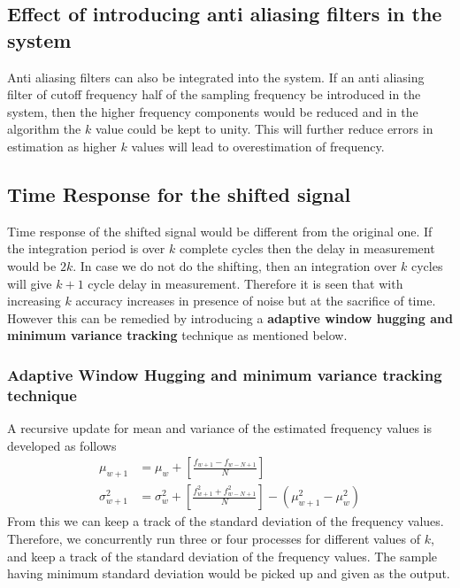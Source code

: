 \subsection{Effect of introducing anti aliasing filters in the system}
Anti aliasing filters can also be integrated into the system. If an anti aliasing filter of cutoff frequency half of the sampling frequency be introduced in the system, then the higher frequency components would be reduced and in the algorithm  the $k$ value could be kept to unity. This will further reduce errors in estimation as higher $k$ values will lead to overestimation of frequency.

\subsection{Time Response for the shifted signal}
Time response of the shifted signal would be different from the original one. If the integration period is over $k$ complete cycles then the delay in measurement would be $2k$. In case we do not do the shifting, then an integration over $k$ cycles will give $k+1$ cycle delay in measurement. Therefore it is seen that with increasing $k$ accuracy increases in presence of noise but at the sacrifice of time. However this can be remedied by introducing a {\bf adaptive window hugging and minimum variance tracking} technique as mentioned below.
\subsubsection{Adaptive Window Hugging and minimum variance tracking technique}
A recursive update for mean and variance of the estimated frequency values is developed as follows
\begin{align*}
\mu_{w+1} &= \mu_w + \left[\frac{f_{w+1}-f_{w-N+1}}{N}\right]\\
\sigma^2_{w+1} &= \sigma^2_{w} + \left[\frac{f^2_{w+1} + f^2_{w-N+1}}{N}\right] - (\mu^2_{w+1} - \mu^2_{w})
\end{align*}
From this we can keep a track of the standard deviation of the frequency values. Therefore, we concurrently run three or four processes for different values of $k$, and keep a track of the standard deviation of the frequency values. The sample having minimum standard deviation would be picked up and given as the output.

